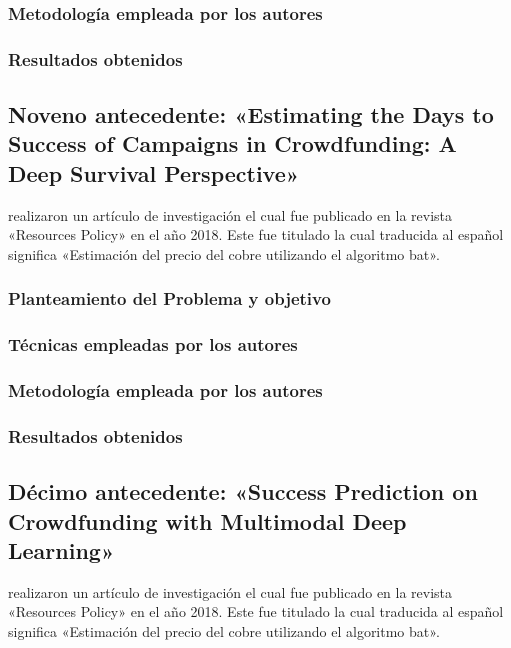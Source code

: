 \subsubsection{Metodología empleada por los autores}


\subsubsection{Resultados obtenidos}



\subsection{Noveno antecedente: «Estimating the Days to Success of Campaigns in Crowdfunding: A Deep Survival Perspective» \citep*{pr_jin2019dayssuccess}}
\citeauthor{pr_jin2019dayssuccess} realizaron un artículo de investigación el cual fue publicado en la revista «Resources Policy» en el año 2018. Este fue titulado  la cual traducida al español significa «Estimación del precio del cobre utilizando el algoritmo bat».

\subsubsection{Planteamiento del Problema y objetivo }


\subsubsection{Técnicas empleadas por los autores}


\subsubsection{Metodología empleada por los autores}


\subsubsection{Resultados obtenidos}



\subsection{Décimo antecedente: «Success Prediction on Crowdfunding with Multimodal Deep Learning» \citep*{pr_cheng2019deeplearning}}
\citeauthor{pr_cheng2019deeplearning} realizaron un artículo de investigación el cual fue publicado en la revista «Resources Policy» en el año 2018. Este fue titulado  la cual traducida al español significa «Estimación del precio del cobre utilizando el algoritmo bat».

